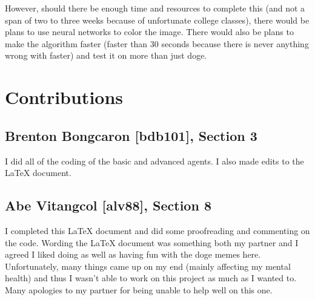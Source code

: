 \documentclass[11pt]{article}
\begin{document}
However, should there be enough time and resources to complete this (and not a span of two to three weeks because of unfortunate college classes), there would be plans to use neural networks to color the image. There would also be plans to make the algorithm faster (faster than 30 seconds because there is never anything wrong with faster) and test it on more than just doge.

\section{Contributions}
\subsection*{Brenton Bongcaron [bdb101], Section 3}
I did all of the coding of the basic and advanced agents. I also made edits to the \LaTeX\: document.
\subsection*{Abe Vitangcol [alv88], Section 8}
I completed this \LaTeX\: document and did some proofreading and commenting on the code. Wording the \LaTeX\: document was something both my partner and I agreed I liked doing as well as having fun with the doge memes here. Unfortunately, many things came up on my end (mainly affecting my mental health) and thus I wasn't able to work on this project as much as I wanted to. Many apologies to my partner for being unable to help well on this one.
\end{document}
